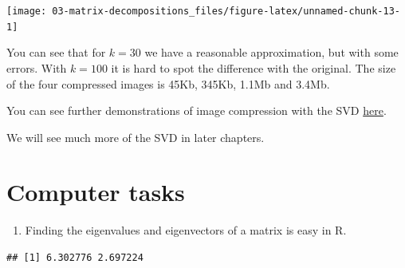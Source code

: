 \documentclass[]{book}
\newenvironment{Shaded}{\begin{snugshade}}{\end{snugshade}}
\newcommand{\CommentTok}[1]{\textcolor[rgb]{0.56,0.35,0.01}{\textit{#1}}}
\newcommand{\DataTypeTok}[1]{\textcolor[rgb]{0.13,0.29,0.53}{#1}}
\newcommand{\DecValTok}[1]{\textcolor[rgb]{0.00,0.00,0.81}{#1}}
\newcommand{\KeywordTok}[1]{\textcolor[rgb]{0.13,0.29,0.53}{\textbf{#1}}}
\newcommand{\NormalTok}[1]{#1}
\newcommand{\OperatorTok}[1]{\textcolor[rgb]{0.81,0.36,0.00}{\textbf{#1}}}
\newcommand{\OtherTok}[1]{\textcolor[rgb]{0.56,0.35,0.01}{#1}}
\providecommand{\tightlist}{%
  \setlength{\itemsep}{0pt}\setlength{\parskip}{0pt}}
\theoremstyle{definition}
\theoremstyle{definition}
\theoremstyle{definition}
\theoremstyle{remark}
\begin{document}
\texttt{[image: 03-matrix-decompositions\_files/figure-latex/unnamed-chunk-13-1]}

You can see that for \(k=30\) we have a reasonable approximation, but with some errors. With \(k=100\) it is hard to spot the difference with the original. The size of the four compressed images is 45Kb, 345Kb, 1.1Mb and 3.4Mb.

You can see further demonstrations of image compression with the SVD \href{http://timbaumann.info/svd-image-compression-demo/}{here}.

We will see much more of the SVD in later chapters.

\hypertarget{tasks-ch3}{%
\section{Computer tasks}\label{tasks-ch3}}

\begin{enumerate}
\def\labelenumi{\arabic{enumi}.}
\tightlist
\item
  Finding the eigenvalues and eigenvectors of a matrix is easy in R.
\end{enumerate}

\begin{Shaded}
\end{Shaded}

\begin{verbatim}
## [1] 6.302776 2.697224
\end{verbatim}

\begin{Shaded}
\end{Shaded}
\end{document}
